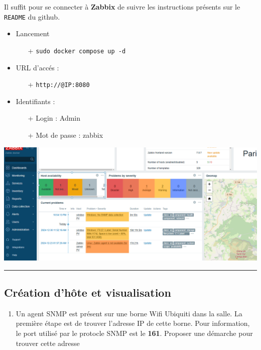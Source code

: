 \documentclass[french, 12pt]{article}%
\newcommand{\itemE}{\item[$\bullet$]}
\begin{document}
Il suffit pour se connecter à \textbf{Zabbix} de suivre les instructions présents sur le \verb?README? du github.
\begin{itemize}
\itemE Lancement
	\begin{itemize}
	\item[+] \verb?sudo docker compose up -d?
	\end{itemize} 
\itemE URL d'accés : 
	\begin{itemize}
	\item[+] \verb?http://@IP:8080?
	\end{itemize}
\itemE Identifiants : 
	\begin{itemize}
	\item[+] Login : Admin
	\item[+] Mot de passe : zabbix 
	
	\end{itemize}

\end{itemize}


\begin{center}
\includegraphics[scale=0.4]{./ressource/zabbix.png}
\end{center}

\begin{center}
 \rule{0.75\linewidth}{1pt}
 \end{center}
\subsection{Création d'hôte et visualisation}

\begin{enumerate}
\item Un agent SNMP est présent sur une borne Wifi Ubiquiti dans la salle. La première étape est de trouver l'adresse IP de cette borne. Pour information, le port utilisé par le protocle SNMP est le \textbf{161}. Proposer une démarche pour trouver cette adresse


\end{enumerate}
\end{document}
